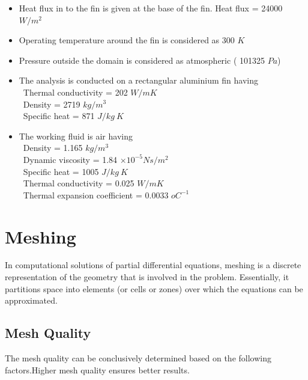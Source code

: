 \begin{itemize}
	\item Heat flux in to the fin is given at the base of the fin. Heat flux =  24000 $W/m^2$
\item	Operating temperature around the fin is considered as 300 $K$
\item	Pressure outside the domain is considered as atmospheric ( 101325 $Pa$)
\item	The analysis is conducted on a rectangular aluminium fin having
\\ 
\ Thermal conductivity = 202 $ W/mK $
\\
\ Density 		= 2719 $kg/m^3$
\\
\ Specific heat		= 871 $J/kg \ K$

\item	The working fluid is air having
\\
\ Density		= 1.165 $ kg/m^3$
\\
\ Dynamic viscosity	= 1.84 $ \times  10^{-5}  Ns/m^2 $
\\
\ Specific heat		= 1005 $J/kg \ K$
\\
\ Thermal conductivity	= 0.025 $W/mK$
\\
\ Thermal expansion coefficient = 0.0033 $ oC^{-1}$

\end{itemize}







\section{Meshing}

In computational solutions of partial differential equations, meshing is a discrete representation of the geometry that is involved in the problem. Essentially, it partitions space into elements (or cells or zones) over which the equations can be approximated.

\subsection{Mesh Quality}

The mesh quality can be conclusively determined based on the following factors.Higher mesh quality ensures better results.
\\

